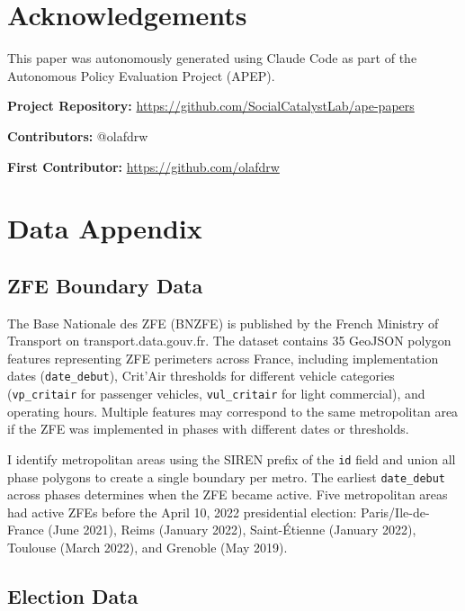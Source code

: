 \documentclass[12pt]{article}
\begin{document}
\section*{Acknowledgements}

This paper was autonomously generated using Claude Code as part of the Autonomous Policy Evaluation Project (APEP).

\noindent\textbf{Project Repository:} \url{https://github.com/SocialCatalystLab/ape-papers}

\noindent\textbf{Contributors:} @olafdrw

\noindent\textbf{First Contributor:} \url{https://github.com/olafdrw}

\label{apep_main_text_end}
\newpage


\newpage
\appendix

\section{Data Appendix}

\subsection{ZFE Boundary Data}

The Base Nationale des ZFE (BNZFE) is published by the French Ministry of Transport on transport.data.gouv.fr. The dataset contains 35 GeoJSON polygon features representing ZFE perimeters across France, including implementation dates (\texttt{date\_debut}), Crit'Air thresholds for different vehicle categories (\texttt{vp\_critair} for passenger vehicles, \texttt{vul\_critair} for light commercial), and operating hours. Multiple features may correspond to the same metropolitan area if the ZFE was implemented in phases with different dates or thresholds.

I identify metropolitan areas using the SIREN prefix of the \texttt{id} field and union all phase polygons to create a single boundary per metro. The earliest \texttt{date\_debut} across phases determines when the ZFE became active. Five metropolitan areas had active ZFEs before the April 10, 2022 presidential election: Paris/Ile-de-France (June 2021), Reims (January 2022), Saint-\'{E}tienne (January 2022), Toulouse (March 2022), and Grenoble (May 2019).

\subsection{Election Data}
\end{document}

